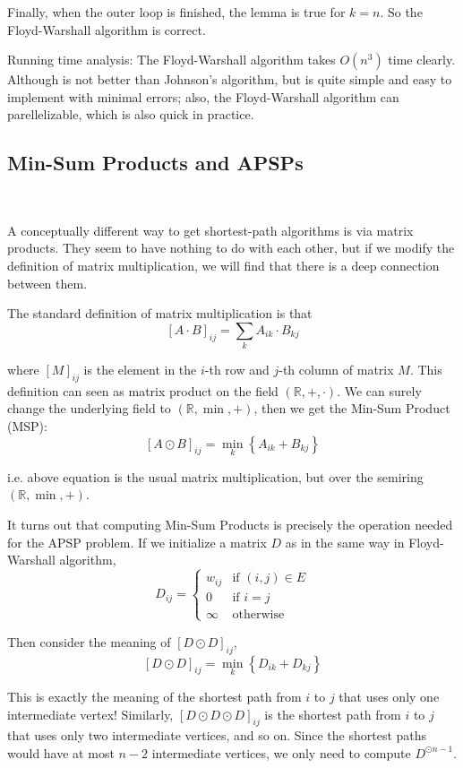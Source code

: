 \documentclass[11pt]{article}
\theoremstyle{plain}
\begin{document}
Finally, when the outer loop is finished, the lemma is true for $k = n$. So the Floyd-Warshall algorithm is correct.

Running time analysis: The Floyd-Warshall algorithm takes $O(n^{3})$ time clearly. Although is not better than 
Johnson's algorithm, but is quite simple and easy to implement with minimal errors; also, the 
Floyd-Warshall algorithm can parellelizable, which is also quick in practice.

\subsection{Min-Sum Products and APSPs}\

A conceptually different way to get shortest-path algorithms is via matrix products. 
They seem to have nothing to do with each other, but if we modify the definition of 
matrix multiplication, we will find that there is a deep connection between them.

The standard definition of matrix multiplication is that
\[
  [A\cdot B]_{ij} = \sum_{k} A_{ik} \cdot B_{kj}
\]

where $[M]_{ij}$ is the element in the $i$-th row and $j$-th column of matrix $M$.
This definition can seen as matrix product on the field $(\mathbb{R}, +, \cdot)$.
We can surely change the underlying field to $(\mathbb{R}, \min, +)$, then we get the
Min-Sum Product (MSP):
\[
  [A\odot B]_{ij} = \min_{k} \left\{ A_{ik} + B_{kj} \right\} 
\]

i.e. above equation is the usual matrix multiplication, but over the semiring $(\mathbb{R}, \min, +)$.

It turns out that computing Min-Sum Products is precisely the operation needed for the APSP problem.
If we initialize a matrix $D$ as in the same way in Floyd-Warshall algorithm,
\[
  D_{ij} = \begin{cases}
    w_{ij} & \text{if } (i, j) \in E \\
    0 & \text{if } i = j \\
    \infty & \text{otherwise}
  \end{cases}
\]

Then consider the meaning of $[D \odot D]_{ij}$,
\[
  [D \odot D]_{ij} = \min_{k} \left\{ D_{ik} + D_{kj} \right\}
\]

This is exactly the meaning of the shortest path from $i$ to $j$ that uses only one intermediate vertex!
Similarly, $[D \odot D \odot D]_{ij}$ is the shortest path from $i$ to $j$ that uses only two intermediate vertices, and so on.
Since the shortest paths would have at most $n-2$ intermediate vertices, we only need to compute $D^{\odot n-1}$.
\end{document}
